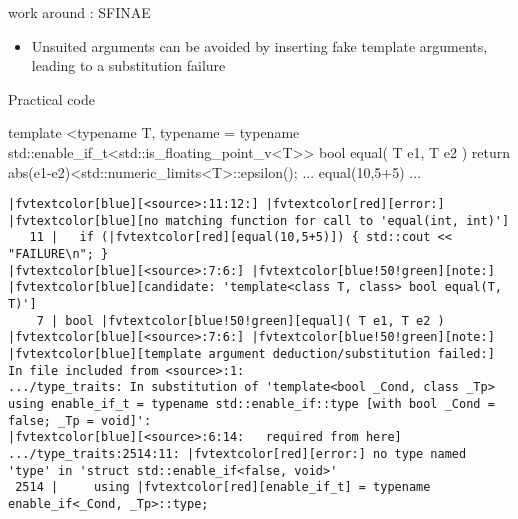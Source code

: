 \begin{frame}[fragile]
  \begin{block}{ work around : SFINAE}
    \begin{itemize}
    \item Unsuited arguments can be avoided by inserting fake template arguments,
    leading to a substitution failure
    \end{itemize}
  \end{block}
  \begin{exampleblock}{Practical code}
    \scriptsize
    \begin{cppcode*}{}
    template
    <typename T,
     typename = typename std::enable_if_t<std::is_floating_point_v<T>>
    bool equal( T e1, T e2 ) {
      return abs(e1-e2)<std::numeric_limits<T>::epsilon();
    }
    ... equal(10,5+5) ...
    \end{cppcode*}
    \pause
    \tiny
    \begin{Verbatim}[commandchars=\|\[\]]
|fvtextcolor[blue][<source>:11:12:] |fvtextcolor[red][error:] |fvtextcolor[blue][no matching function for call to 'equal(int, int)']
   11 |   if (|fvtextcolor[red][equal(10,5+5)]) { std::cout << "FAILURE\n"; }
|fvtextcolor[blue][<source>:7:6:] |fvtextcolor[blue!50!green][note:] |fvtextcolor[blue][candidate: 'template<class T, class> bool equal(T, T)']
    7 | bool |fvtextcolor[blue!50!green][equal]( T e1, T e2 )
|fvtextcolor[blue][<source>:7:6:] |fvtextcolor[blue!50!green][note:]   |fvtextcolor[blue][template argument deduction/substitution failed:]
In file included from <source>:1:
.../type_traits: In substitution of 'template<bool _Cond, class _Tp>
using enable_if_t = typename std::enable_if::type [with bool _Cond = false; _Tp = void]':
|fvtextcolor[blue][<source>:6:14:   required from here]
.../type_traits:2514:11: |fvtextcolor[red][error:] no type named 'type' in 'struct std::enable_if<false, void>'
 2514 |     using |fvtextcolor[red][enable_if_t] = typename enable_if<_Cond, _Tp>::type;
    \end{Verbatim}
  \end{exampleblock}
\end{frame}

